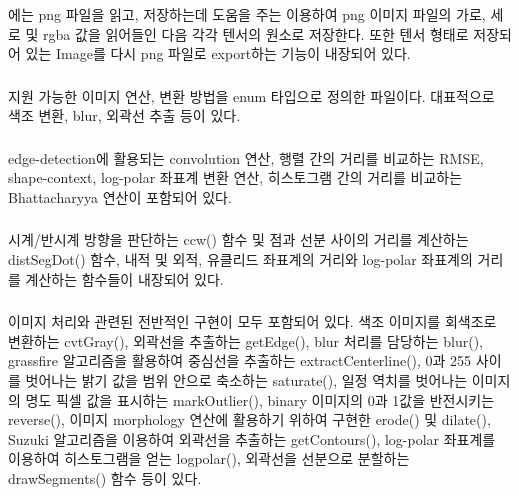 \documentclass[conference]{IEEEtran}
\begin{document}
\subsubsection{\egLoader}

\egLoader 에는 png 파일을 읽고, 저장하는데 도움을 주는  이용하여 png 이미지 파일의 가로, 세로 및 rgba 값을 읽어들인 다음 각각 텐서의 원소로 저장한다.
또한 \Eigen 텐서 형태로 저장되어 있는 Image를 다시 png 파일로 export하는 기능이 내장되어 있다.

\subsubsection{\egMethods}

 지원 가능한 이미지 연산, 변환 방법을 enum 타입으로 정의한 파일이다.
대표적으로 색조 변환, blur, 외곽선 추출 등이 있다.

\subsubsection{\egMath}

 edge-detection에 활용되는 convolution 연산, 행렬 간의 거리를 비교하는 RMSE, shape-context, log-polar 좌표계 변환 연산, 히스토그램 간의 거리를 비교하는 Bhattacharyya 연산이 포함되어 있다.

\subsubsection{\egGeometry}

 시계/반시계 방향을 판단하는 ccw() 함수 및 점과 선분 사이의 거리를 계산하는 distSegDot() 함수, 내적 및 외적, 유클리드 좌표계의 거리와 log-polar 좌표계의 거리를 계산하는 함수들이 내장되어 있다. 

\subsubsection{\egProcessing}

 이미지 처리와 관련된 전반적인 구현이 모두 포함되어 있다.
색조 이미지를 회색조로 변환하는 cvtGray(),
외곽선을 추출하는 getEdge(),
blur 처리를 담당하는 blur(),
grassfire 알고리즘을 활용하여 중심선을 추출하는 extractCenterline(),
0과 255 사이를 벗어나는 밝기 값을 범위 안으로 축소하는 saturate(),
일정 역치를 벗어나는 이미지의 명도 픽셀 값을 표시하는 markOutlier(),
binary 이미지의 0과 1값을 반전시키는 reverse(),
이미지 morphology 연산에 활용하기 위하여 구현한 erode() 및 dilate(),
Suzuki 알고리즘을 이용하여 외곽선을 추출하는 getContours(),
log-polar 좌표계를 이용하여 히스토그램을 얻는 logpolar(),
외곽선을 선분으로 분할하는 drawSegments() 함수 등이 있다.
\end{document}
